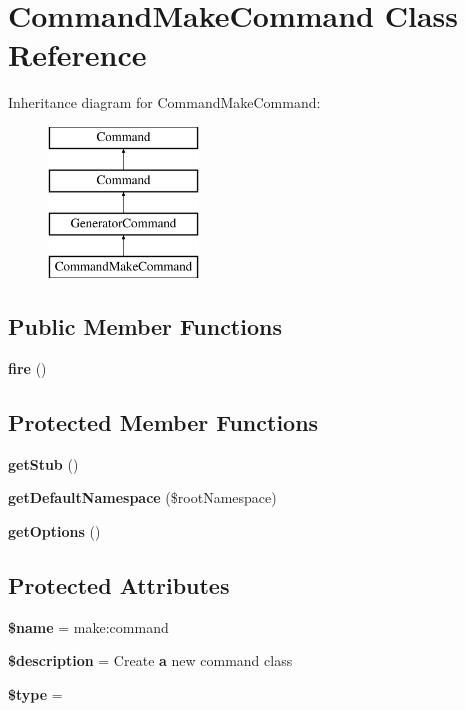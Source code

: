 \section{Command\+Make\+Command Class Reference}
\label{class_illuminate_1_1_foundation_1_1_console_1_1_command_make_command}
Inheritance diagram for Command\+Make\+Command\+:\begin{figure}[H]
\begin{center}
\leavevmode
\includegraphics[height=4.000000cm]{class_illuminate_1_1_foundation_1_1_console_1_1_command_make_command}
\end{center}
\end{figure}
\subsection*{Public Member Functions}
\begin{DoxyCompactItemize}
\item 
{\bf fire} ()
\end{DoxyCompactItemize}
\subsection*{Protected Member Functions}
\begin{DoxyCompactItemize}
\item 
{\bf get\+Stub} ()
\item 
{\bf get\+Default\+Namespace} (\$root\+Namespace)
\item 
{\bf get\+Options} ()
\end{DoxyCompactItemize}
\subsection*{Protected Attributes}
\begin{DoxyCompactItemize}
\item 
{\bf \$name} = \textquotesingle{}make\+:command\textquotesingle{}
\item 
{\bf \$description} = \textquotesingle{}Create {\bf a} new command class\textquotesingle{}
\item 
{\bf \$type} = \textquotesingle{}
\end{DoxyCompactItemize}


